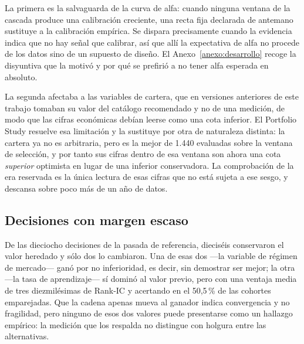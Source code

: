 La primera es la salvaguarda de la curva de alfa: cuando ninguna ventana de la cascada produce una
calibración creciente, una recta fija declarada de antemano sustituye a la calibración empírica. Se
dispara precisamente cuando la evidencia indica que no hay señal que calibrar, así que allí la
expectativa de alfa no procede de los datos sino de un supuesto de diseño. El Anexo~\ref{anexo:desarrollo}
recoge la disyuntiva que la motivó y por qué se prefirió a no tener alfa esperada en absoluto.

La segunda afectaba a las variables de cartera, que en versiones anteriores de este trabajo tomaban
su valor del catálogo recomendado y no de una medición, de modo que las cifras económicas debían
leerse como una cota inferior. El Portfolio Study resuelve esa limitación y la sustituye por otra de
naturaleza distinta: la cartera ya no es arbitraria, pero es la mejor de 1.440 evaluadas sobre la
ventana de selección, y por tanto sus cifras dentro de esa ventana son ahora una cota \emph{superior}
optimista en lugar de una inferior conservadora. La comprobación de la era reservada es la única
lectura de esas cifras que no está sujeta a ese sesgo, y descansa sobre poco más de un año de datos.

\subsection{Decisiones con margen escaso}

De las dieciocho decisiones de la pasada de referencia, dieciséis conservaron el valor heredado y
sólo dos lo cambiaron. Una de esas dos ---la variable de régimen de mercado--- ganó por no
inferioridad, es decir, sin demostrar ser mejor; la otra ---la tasa de aprendizaje--- sí dominó al
valor previo, pero con una ventaja media de tres diezmilésimas de Rank-IC y acertando en el
50,5\,\% de las cohortes emparejadas. Que la cadena apenas mueva al ganador indica convergencia y no
fragilidad, pero ninguno de esos dos valores puede presentarse como un hallazgo empírico: la
medición que los respalda no distingue con holgura entre las alternativas.
